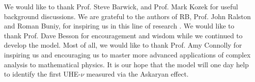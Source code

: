 \documentclass[amsmath,amssymb,aps,prd,10pt,twocolumn,showkeys]{revtex4}
\begin{document}
We would like to thank Prof. Steve Barwick, and Prof. Mark Kozek for useful background discussions.  We are grateful to the authors of RB, Prof. John Ralston and Roman Buniy, for inspiring us in this line of research \cite{10.1103/physrevd.65.016003}.  We would like to thank Prof. Dave Besson for encouragement and wisdom while we continued to develop the model.  Most of all, we would like to thank Prof. Amy Connolly for inspiring us and encouraging us to master more advanced applications of complex analysis to mathematical physics.  It is our hope that the model will one day help to identify the first UHE-$\nu$ measured via the Askaryan effect.


\end{document}
